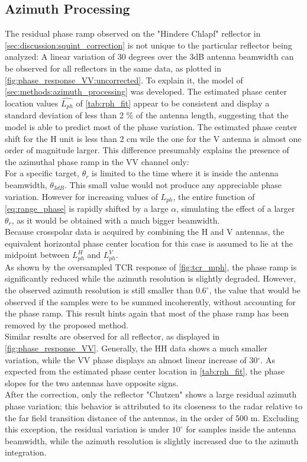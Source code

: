 \subsection{Azimuth Processing}\label{sec:discussion:azimuth_processing}
The residual phase ramp observed on the "Hindere Chlapf" reflector in \autoref{sec:discussion:squint_correction} is not unique to the particular reflector being analyzed: A linear variation of 30 degrees over the 3dB antenna beamwidth can be observed for all reflectors in the same data, as plotted in  \autoref{fig:phase_response_VV:uncorrected}. To explain it, the model of \autoref{sec:methods:azimuth_processing} was developed.
The estimated phase center location values $\hat{L_{ph}}$ of \autoref{tab:rph_fit} appear to be consistent and display a standard deviation of less than 2 \% of the antenna length, suggesting that the model is able to predict most of the phase variation. The estimated phase center shift for the H unit is less than 2 cm wile the one for the V antenna is almost one order of magnitude larger. This difference presumably explains the presence of the azimuthal phase ramp in the VV channel only:\\
For a specific target,  $\theta_r$ is limited to the time where it is inside the antenna beamwidth, $\theta_{3dB}$. This small value would not produce any appreciable phase variation. However for increasing values of $L_{ph}$, the entire function of \autoref{eq:range_phase} is rapidly shifted  by a large $\alpha$, simulating the effect of a larger $\theta_r$, as it would be obtained with a much bigger beamwidth.\\
Because crosspolar data is acquired by combining the H and V antennas, the equivalent horizontal phase center location for this case is assumed to lie at the midpoint between $L_{ph}^{H}$ and $L_{ph}^{V}$.\\
As shown by the oversampled TCR response of \autoref{fig:tcr_mph}, the phase ramp is significantly reduced while the azimuth resolution is slightly degraded. However, the observed azimuth resolution is still smaller than $0.6^\circ$, the value that would be observed if the samples were to be summed incoherently, without accounting for the phase ramp. This result hints again that  most of the phase ramp has been removed by the proposed method.\\
Similar results are observed for all reflector, as displayed in \autoref{fig:phase_response_VV}.  Generally, the HH data shows a much smaller variation, while the VV phase displays an almost linear increase of 30$^\circ$. As expected from the estimated phase center location in \autoref{tab:rph_fit}, the phase slopes for the two antennas have opposite signs.\\  After the correction, only the reflector "Chutzen" shows a large residual azimuth phase variation; this behavior is attributed to its closeness to the radar relative to the far field transition distance of the antennas, in the order of 500 m. Excluding this exception, the residual variation is under $10^\circ$ for samples inside the antenna beamwidth, while the azimuth resolution is slightly increased due to the azimuth integration.
